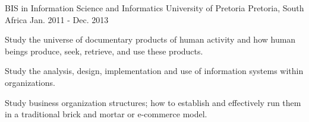 

\begin{cventries}

  \cventry
    {BIS in Information Science and Informatics} %
    {University of Pretoria} %
    {Pretoria, South Africa} %
    {Jan. 2011 - Dec. 2013} %
    {
      \begin{cvitems} %
        \item {Study the universe of documentary products of human activity and how human beings produce, seek, retrieve, and use these products.}
        \item {Study the analysis, design, implementation and use of information systems within organizations.}
        \item {Study business organization structures; how to establish and effectively run them in a traditional brick and mortar or e-commerce model.}
      \end{cvitems}
    }
\end{cventries}
